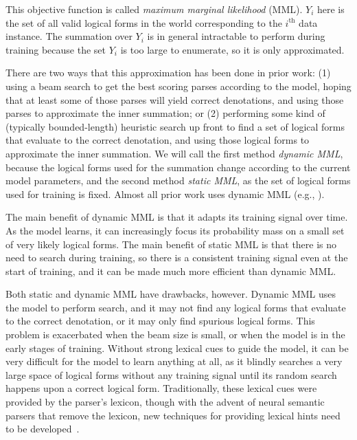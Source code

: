 \noindent This objective function is called \emph{maximum marginal likelihood}
(MML).  $Y_i$ here is the set of all valid logical forms in the world
corresponding to the $i^\text{th}$ data instance. The summation over $Y_i$ is in
general intractable to perform during training because the set $Y_i$ is too
large to enumerate, so it is only approximated.

There are two ways that this approximation has been done in prior work: (1)
using a beam search to get the best scoring parses according to the model,
hoping that at least some of those parses will yield correct denotations, and
using those parses to approximate the inner summation; or (2) performing some
kind of (typically bounded-length) heuristic search up front to find a set of
logical forms that evaluate to the correct denotation, and using those logical
forms to approximate the inner summation.  We will call the first method
\emph{dynamic MML}, because the logical forms used for the summation change
according to the current model parameters, and the second method \emph{static
MML}, as the set of logical forms used for training is fixed.  Almost all prior
work uses dynamic MML (e.g.,
\citet{liang2011learning,berant2013semantic,goldman2017weakly}).

The main benefit of dynamic MML is that it adapts its training signal over
time.  As the model learns, it can increasingly focus its probability mass on a
small set of very likely logical forms.  The main benefit of static MML is that
there is no need to search during training, so there is a consistent training
signal even at the start of training, and it can be made much more efficient
than dynamic MML\@.

Both static and dynamic MML have drawbacks, however.  Dynamic MML uses the
model to perform search, and it may not find any logical forms that evaluate to
the correct denotation, or it may only find spurious logical forms.  This
problem is exacerbated when the beam size is small, or when the model is in the
early stages of training.  Without strong lexical cues to guide the model, it
can be very difficult for the model to learn anything at all, as it blindly
searches a very large space of logical forms without any training signal until
its random search happens upon a correct logical form.  Traditionally, these
lexical cues were provided by the parser's lexicon, though with the advent of
neural semantic parsers that remove the lexicon, new techniques for providing
lexical hints need to be developed~\citep{goldman2017weakly}.

